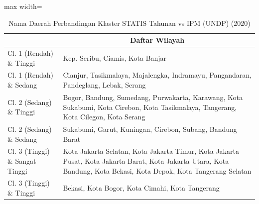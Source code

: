 \begin{table}[H]
\centering
\caption{Nama Daerah Perbandingan Klaster STATIS Tahunan vs IPM (UNDP) (2020)} \label{tab:app1statis_ipm_name_2020}
\begin{adjustbox}{max width=\textwidth}
\begin{tabular}{|>{\centering\arraybackslash}p{4cm}|p{10cm}|}
\hline
\multicolumn{1}{|c|}{\textbf{Kategori}} & \multicolumn{1}{c|}{\textbf{Daftar Wilayah}} \\
\hline
Cl. 1 (Rendah) \& Tinggi & Kep. Seribu, Ciamis, Kota Banjar \\
\hline
Cl. 1 (Rendah) \& Sedang & Cianjur, Tasikmalaya, Majalengka, Indramayu, Pangandaran, Pandeglang, Lebak, Serang \\
\hline
Cl. 2 (Sedang) \& Tinggi & Bogor, Bandung, Sumedang, Purwakarta, Karawang, Kota Sukabumi, Kota Cirebon, Kota Tasikmalaya, Tangerang, Kota Cilegon, Kota Serang \\
\hline
Cl. 2 (Sedang) \& Sedang & Sukabumi, Garut, Kuningan, Cirebon, Subang, Bandung Barat \\
\hline
Cl. 3 (Tinggi) \& Sangat Tinggi & Kota Jakarta Selatan, Kota Jakarta Timur, Kota Jakarta Pusat, Kota Jakarta Barat, Kota Jakarta Utara, Kota Bandung, Kota Bekasi, Kota Depok, Kota Tangerang Selatan \\
\hline
Cl. 3 (Tinggi) \& Tinggi & Bekasi, Kota Bogor, Kota Cimahi, Kota Tangerang \\
\hline
\end{tabular}
\end{adjustbox}
\end{table}